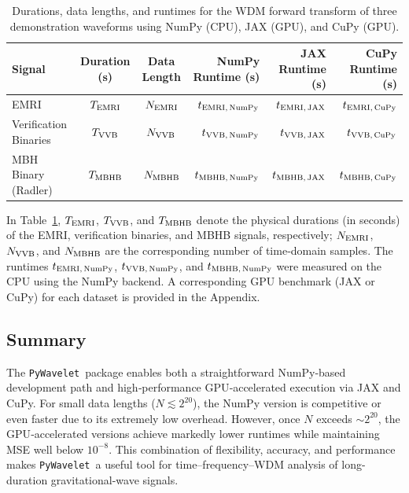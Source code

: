 \documentclass[%
 reprint,
superscriptaddress,
nofootinbib,
 amsmath,amssymb,
 aps,
colorlinks = true, 
linkcolor = blue, 
urlcolor = blue, 
citecolor = blue, 
anchorcolor = blue,
]{revtex4-2}
\newcommand{\package}{\texttt{PyWavelet}}
\begin{document}
\begin{table}[h]
    \centering
    \begin{tabular}{lccrrr}
        \toprule
        \textbf{Signal} & \textbf{Duration (s)} & \textbf{Data Length} & \textbf{NumPy Runtime (s)} & \textbf{JAX Runtime (s)} & \textbf{CuPy Runtime (s)} \\
        \midrule
        EMRI                   & $T_{\rm EMRI}$      & $N_{\rm EMRI}$     & $t_{\rm EMRI,\,\text{NumPy}}$ & $t_{\rm EMRI,\,\text{JAX}}$ & $t_{\rm EMRI,\,\text{CuPy}}$   \\
        Verification Binaries  & $T_{\rm VVB}$       & $N_{\rm VVB}$      & $t_{\rm VVB,\,\text{NumPy}}$  & $t_{\rm VVB,\,\text{JAX}}$  & $t_{\rm VVB,\,\text{CuPy}}$    \\
        MBH Binary (Radler)    & $T_{\rm MBHB}$      & $N_{\rm MBHB}$     & $t_{\rm MBHB,\,\text{NumPy}}$ & $t_{\rm MBHB,\,\text{JAX}}$ & $t_{\rm MBHB,\,\text{CuPy}}$   \\
        \bottomrule
    \end{tabular}
    \caption{Durations, data lengths, and runtimes for the WDM forward transform of three demonstration waveforms using NumPy (CPU), JAX (GPU), and CuPy (GPU).}
    \label{tab:waveform_specs}
\end{table}

In Table~\ref{tab:waveform_specs}, $T_{\rm EMRI}$, $T_{\rm VVB}$, and $T_{\rm MBHB}$ denote the physical durations (in seconds) of the EMRI, verification binaries, and MBHB signals, respectively; $N_{\rm EMRI}$, $N_{\rm VVB}$, and $N_{\rm MBHB}$ are the corresponding number of time‐domain samples. 
The runtimes $t_{\rm EMRI,\,NumPy}$, $t_{\rm VVB,\,NumPy}$, and $t_{\rm MBHB,\,NumPy}$ were measured on the CPU using the NumPy backend. 
A corresponding GPU benchmark (JAX or CuPy) for each dataset is provided in the Appendix.

\subsection{Summary}
\label{subsec:summary}

The \package\ package enables both a straightforward NumPy‐based development path and high‐performance GPU‐accelerated execution via JAX and CuPy. 
For small data lengths ($N \lesssim 2^{20}$), the NumPy version is competitive or even faster due to its extremely low overhead. 
However, once $N$ exceeds $\sim 2^{20}$, the GPU‐accelerated versions achieve markedly lower runtimes while maintaining MSE well below $10^{-8}$. 
This combination of flexibility, accuracy, and performance makes \package\ a useful tool for time–frequency–WDM analysis of long-duration gravitational-wave signals.
\end{document}
